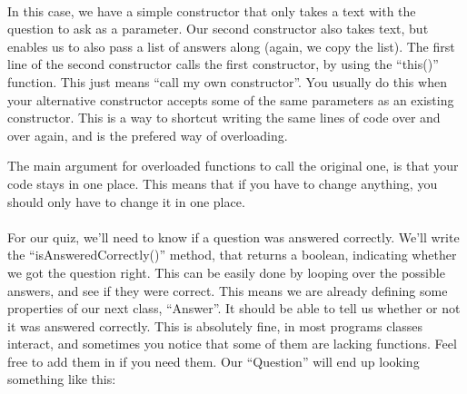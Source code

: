 \documentclass[11pt,fleqn]{book} %
\begin{document}
\paragraph{} In this case, we have a simple constructor that only takes a text with the question to ask as a parameter. Our second constructor also takes text, but enables us to also pass a list of answers along (again, we copy the list). The first line of the second constructor  calls the first constructor, by using the ``this()'' function. This just means ``call my own constructor''.
You usually do this when your alternative constructor accepts some of the same parameters as an existing constructor. This is a way to shortcut writing the same lines of code over and over again, and is the prefered way of overloading.

\begin{remark}
The main argument for overloaded functions to call the original one, is that your code stays in one place. This means that if you have to change anything, you should only have to change it in one place.
\end{remark}

\paragraph{}For our quiz, we'll need to know if a question was answered correctly. We'll write the ``isAnsweredCorrectly()'' method, that returns a boolean, indicating whether we got the question right. This can be easily done by looping over the possible answers, and see if they were correct. This means we are already defining some properties of our next class, ``Answer''. It should be able to tell us whether or not it was answered correctly. This is absolutely fine, in most programs classes interact, and sometimes you notice that some of them are lacking functions. Feel free to add them in if you need them. Our ``Question'' will end up looking something like this:
\end{document}
